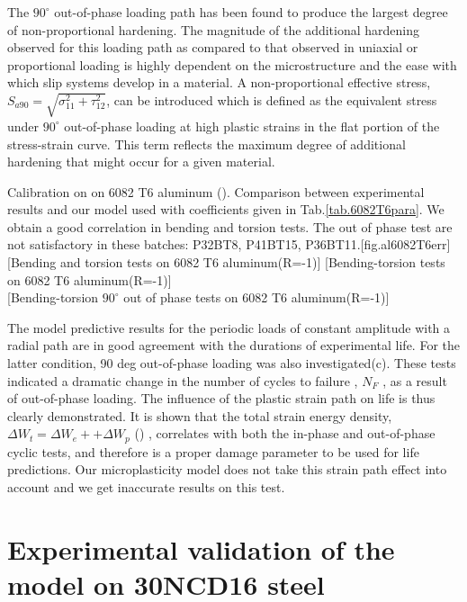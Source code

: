 The $90^\circ$ out-of-phase loading path has been found to produce the largest degree of non-proportional hardening. The magnitude of the additional hardening observed for this loading path as compared to that observed in uniaxial or proportional loading is highly dependent on the microstructure and the ease with which slip systems develop in a material. A non-proportional effective stress, $S_{a90}=\sqrt{\sigma_{11}^2+\tau_{12}^2}$, can be introduced which is defined as the equivalent stress under $90^\circ$ out-of-phase loading at high plastic strains in the flat portion of the stress-strain curve. This term reflects the maximum degree of additional hardening that might occur for a given material.



\begin{Figure}[!h]{Calibration on on 6082 T6 aluminum (\cite{susmel2003multiaxial}). Comparison between experimental results and our model used with coefficients given in Tab.\ref{tab.6082T6para}. We obtain a good correlation in bending and torsion tests. The out of phase test are not satisfactory in these batches: P32BT8, P41BT15, P36BT11.}[fig.al6082T6err]
[Bending and torsion tests on 6082 T6 aluminum(R=-1)]
[Bending-torsion tests on 6082 T6 aluminum(R=-1)]
\\
[Bending-torsion $90^\circ$ out of phase tests on 6082 T6 aluminum(R=-1)]
\end{Figure}

The model predictive results for the periodic loads of constant amplitude with a radial path are in good agreement with the durations of experimental life. For the latter condition, 90 deg out-of-phase loading was also investigated(c). These tests indicated a dramatic change in the number of cycles to failure , $N_F$ , as a result of out-of-phase loading. The influence of the plastic strain path on life is thus clearly demonstrated. It is shown that the total strain energy density, $ΔW_t = ΔW_e+ + ΔW_p$ (\cite{ellyin1991phase}) , correlates with both the in-phase and out-of-phase cyclic tests, and therefore is a proper damage parameter to be used for life predictions. Our microplasticity model does not take this strain path effect into account and we get inaccurate results on this test.



\clearpage
\section{Experimental validation of the model on 30NCD16 steel}
